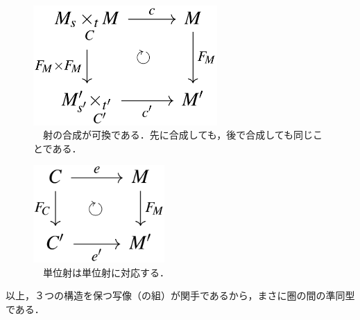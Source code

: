 \documentclass[uplatex, 12pt, a4paper, dvipdfmx]{jsarticle}
\begin{document}
\begin{figure}[ht]\begin{center} \caption{\label{cd-6}　射の合成が可換である．先に合成しても，後で合成しても同じことである．}
    \includegraphics[width=7cm]{cd-6.png}
\end{center}\end{figure}

\begin{figure}[ht]\begin{center} \caption{\label{cd-7}　単位射は単位射に対応する．}
    \includegraphics[width=5cm]{cd-7.png}
\end{center}\end{figure}

以上，３つの構造を保つ写像（の組）が関手であるから，まさに圏の間の準同型である．
\end{document}
